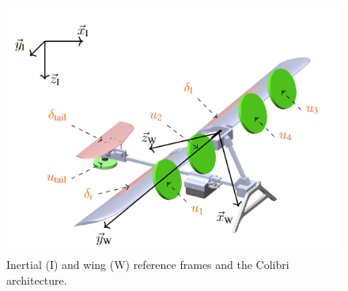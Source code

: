
\begin{figure}[h]
\centering
    \includegraphics[width=1\columnwidth,angle=0,trim={0 0 0 0.5cm},clip]{figures/wold_body.png}
    \caption{Inertial (I) and wing (W) reference frames and the Colibri architecture. }
    \label{fig:world_body}
\end{figure}

